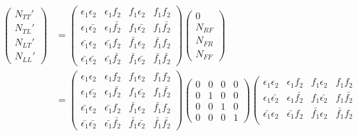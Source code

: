 \begin{align}
\begin{split}
\left( \begin{array}{c}
N_{TT}' \\
N_{TL}' \\
N_{LT}' \\
N_{LL}'
\end{array} \right)
&=
\left( \begin{array}{cccc}
\epsilon_1 \epsilon_2 & \epsilon_1 f_2 & f_1 \epsilon_2 & f_1 f_2 \\
\epsilon_1 \bar{\epsilon_2} & \epsilon_1 \bar{f_2} & f_1 \bar{\epsilon_2} & f_1 \bar{f_2} \\
\bar{\epsilon_1} \epsilon_2 & \bar{\epsilon_1} f_2 & \bar{f_1} \epsilon_2 & \bar{f_1} f_2 \\
\bar{\epsilon_1} \bar{\epsilon_2} & \bar{\epsilon_1} \bar{f_2} & \bar{f_1} \bar{\epsilon_2} & \bar{f_1} \bar{f_2}
\end{array} \right)
\left( \begin{array}{c}
0 \\
N_{RF} \\
N_{FR} \\
N_{FF}
\end{array} \right) \\
&=
\left( \begin{array}{cccc}
\epsilon_1 \epsilon_2 & \epsilon_1 f_2 & f_1 \epsilon_2 & f_1 f_2 \\
\epsilon_1 \bar{\epsilon_2} & \epsilon_1 \bar{f_2} & f_1 \bar{\epsilon_2} & f_1 \bar{f_2} \\
\bar{\epsilon_1} \epsilon_2 & \bar{\epsilon_1} f_2 & \bar{f_1} \epsilon_2 & \bar{f_1} f_2 \\
\bar{\epsilon_1} \bar{\epsilon_2} & \bar{\epsilon_1} \bar{f_2} & \bar{f_1} \bar{\epsilon_2} & \bar{f_1} \bar{f_2}
\end{array} \right)
\left( \begin{array}{cccc}
0 & 0 & 0 & 0 \\
0 & 1 & 0 & 0 \\
0 & 0 & 1 & 0 \\
0 & 0 & 0 & 1
\end{array} \right)
\left( \begin{array}{cccc}
\epsilon_1 \epsilon_2 & \epsilon_1 f_2 & f_1 \epsilon_2 & f_1 f_2 \\
\epsilon_1 \bar{\epsilon_2} & \epsilon_1 \bar{f_2} & f_1 \bar{\epsilon_2} & f_1 \bar{f_2} \\
\bar{\epsilon_1} \epsilon_2 & \bar{\epsilon_1} f_2 & \bar{f_1} \epsilon_2 & \bar{f_1} f_2 \\

\end{array}
\end{split}
\end{align}

